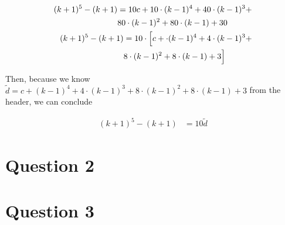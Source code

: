 \documentclass[12pt]{article}
\begin{document}
\begin{itemize}
\begin{itemize}
\begin{itemize}
\begin{mdframed}
\begin{enumerate}[1.]
\begin{mdframed}
                    \begin{align}
                        \begin{split}
                        (k+1)^5 - (k+1) &= 10c + 10 \cdot (k-1)^4 + 40 \cdot (k-1)^3 + \\
                        & 80 \cdot (k-1)^2 + 80 \cdot(k-1) + 30
                        \end{split}\\
                        \begin{split}
                        (k+1)^5 - (k+1) &= 10 \cdot \Bigl[c +\cdot (k-1)^4 + 4 \cdot (k-1)^3 + \\
                        & 8 \cdot (k-1)^2 + 8 \cdot(k-1) + 3\Bigr]
                        \end{split}\\
                    \end{align}

                    \bigskip

                    Then, because we know $\tilde{d} = c + (k-1)^4 + 4 \cdot (k-1)^3 + 8 \cdot (k-1)^2 +
                    8 \cdot(k-1) + 3$ from the header, we can conclude

                    \begin{align}
                        (k+1)^5 - (k+1) &= 10 \tilde{d}
                    \end{align}

                    \end{mdframed}
                \end{enumerate}
            \end{mdframed}
        \end{itemize}
    \end{itemize}
\end{itemize}

\section*{Question 2}

\section*{Question 3}
\end{document}
